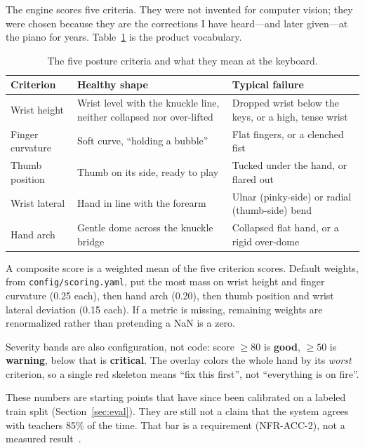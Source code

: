 \documentclass[11pt,a4paper]{article}
\newcommand{\code}[1]{\texttt{#1}}
\begin{document}
The engine scores five criteria.
They were not invented for computer vision; they were chosen because they are the corrections I have heard---and later given---at the piano for years.
Table~\ref{tab:criteria} is the product vocabulary.

\begin{table}[ht]
\centering
\caption{The five posture criteria and what they mean at the keyboard.}
\label{tab:criteria}
\begin{tabularx}{\textwidth}{@{}l>{\raggedright\arraybackslash}X>{\raggedright\arraybackslash}X@{}}
\toprule
\textbf{Criterion} & \textbf{Healthy shape} & \textbf{Typical failure} \\
\midrule
Wrist height & Wrist level with the knuckle line, neither collapsed nor over-lifted & Dropped wrist below the keys, or a high, tense wrist \\
Finger curvature & Soft curve, \enquote{holding a bubble} & Flat fingers, or a clenched fist \\
Thumb position & Thumb on its side, ready to play & Tucked under the hand, or flared out \\
Wrist lateral & Hand in line with the forearm & Ulnar (pinky-side) or radial (thumb-side) bend \\
Hand arch & Gentle dome across the knuckle bridge & Collapsed flat hand, or a rigid over-dome \\
\bottomrule
\end{tabularx}
\end{table}

A composite score is a weighted mean of the five criterion scores.
Default weights, from \code{config/scoring.yaml}, put the most mass on wrist height and finger curvature (0.25 each), then hand arch (0.20), then thumb position and wrist lateral deviation (0.15 each).
If a metric is missing, remaining weights are renormalized rather than pretending a NaN is a zero.

Severity bands are also configuration, not code:
score \(\ge 80\) is \textbf{good}, \(\ge 50\) is \textbf{warning}, below that is \textbf{critical}.
The overlay colors the whole hand by its \emph{worst} criterion, so a single red skeleton means \enquote{fix this first}, not \enquote{everything is on fire}.

These numbers are starting points that have since been calibrated on a labeled train split (Section~\ref{sec:eval}).
They are still not a claim that the system agrees with teachers 85\% of the time.
That bar is a requirement (NFR-ACC-2), not a measured result~\cite{prd,mlupgrade}.
\end{document}
